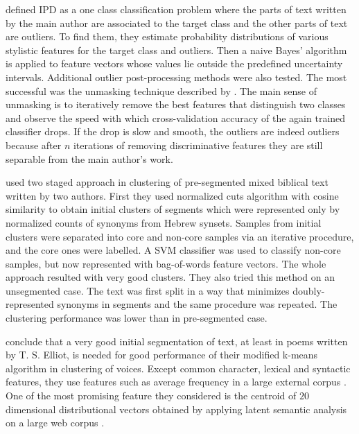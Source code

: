 \documentclass[10pt, a4paper]{article}
\begin{document}
\citet{stein-2011} defined IPD as a one class classification problem where the parts of text written by the main author are associated to the target class and the other parts of text are outliers. To find them, they estimate probability distributions of various stylistic features for the target class and outliers. Then a naive Bayes' algorithm is applied to feature vectors whose values lie outside the predefined uncertainty intervals. Additional outlier post-processing methods were also tested. The most successful was the unmasking technique described by \citet{koppel-2009}. The main sense of unmasking is to iteratively remove the best features that distinguish two classes and observe the speed with which cross-validation accuracy of the again trained classifier drops. If the drop is slow and smooth, the outliers are indeed outliers because after $n$ iterations of removing discriminative features they are still separable from the main author's work.

\citet{koppel-2011} used two staged approach in clustering of pre-segmented mixed biblical text written by two authors. First they used normalized cuts algorithm with cosine similarity to obtain initial clusters of segments which were represented only by normalized counts of synonyms from Hebrew synsets. Samples from initial clusters were separated into core and non-core samples via an iterative procedure, and the core ones were labelled. A SVM classifier was used to classify non-core samples, but now represented with bag-of-words feature vectors. The whole approach resulted with very good clusters. They also tried this method on an unsegmented case. The text was first split in a way that minimizes doubly-represented synonyms in segments and the same procedure was repeated. The clustering performance was lower than in pre-segmented case.

\citet{brooke-2013} conclude that a very good initial segmentation of text, at least in poems written by T. S. Elliot, is needed for good performance of their modified k-means algorithm in clustering of voices. Except common character, lexical and syntactic features, they use features such as average frequency in a large external corpus \citep{brants-2006}. One of the most promising feature they considered is the centroid of $20$ dimensional distributional vectors obtained by applying latent semantic analysis on a large web corpus \cite{landauer-1997}.
\end{document}
